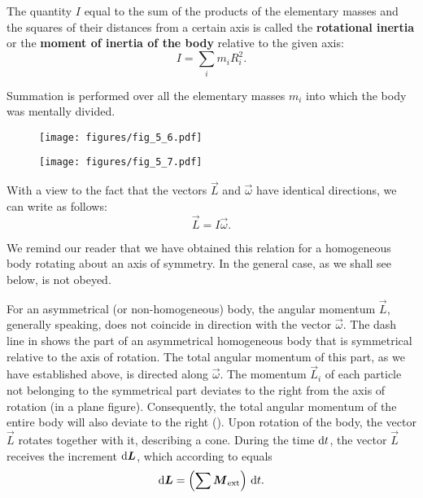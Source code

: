 \noindent
The quantity $I$ equal to the sum of the products of the elementary masses and the squares of their distances from a certain axis is called the \textbf{rotational inertia} or the \textbf{moment of inertia of the body} relative to the given axis:
\begin{equation}\label{eq:5_11}
I = \sum_i m_i R_i^2.
\end{equation}

\noindent
Summation is performed over all the elementary masses $m_i$ into which the body was mentally divided.

\begin{figure}[t]
	\begin{minipage}[t]{0.5\linewidth}
		\begin{center}
			\texttt{[image: figures/fig\_5\_6.pdf]}
			\caption[]{}
			\label{fig:5_6}
		\end{center}
	\end{minipage}
	\hspace{-0.05cm}
	\begin{minipage}[t]{0.5\linewidth}
		\begin{center}
			\texttt{[image: figures/fig\_5\_7.pdf]}
			\caption[]{}
			\label{fig:5_7}
		\end{center}
	\end{minipage}
\vspace{-0.7cm}
\end{figure}

With a view to the fact that the vectors $\vec{L}$ and $\vec{\omega}$ have identical directions, we can write  as follows:
\begin{equation}\label{eq:5_12}
\vec{L} = I \vec{\omega}.
\end{equation}

\noindent
We remind our reader that we have obtained this relation for a homogeneous body rotating about an axis of symmetry. In the general case, as we shall see below,  is not obeyed.

For an asymmetrical (or non-homogeneous) body, the angular momentum $\vec{L}$, generally speaking, does not coincide in direction with the vector $\vec{\omega}$. The dash line in  shows the part of an asymmetrical homogeneous body that is symmetrical relative to the axis of rotation. The total angular momentum of this part, as we have established above, is directed along $\vec{\omega}$. The momentum $\vec{L}_i$ of each particle not belonging to the symmetrical part deviates to the right from the axis of rotation (in a plane figure). Consequently, the total angular momentum of the entire body will also deviate to the right (). Upon rotation of the body, the vector $\vec{L}$ rotates together with it, describing a cone. During the time $\mathrm{d} t$, the vector $\vec{L}$ receives the increment $\mathrm{d}\boldsymbol{L}$, which according to  equals
\begin{equation}\label{eq:5_13}
\mathrm{d}\boldsymbol{L} = \left( \sum \boldsymbol{M}_{\text{ext}} \right) \, \mathrm{d} t.
\end{equation}

